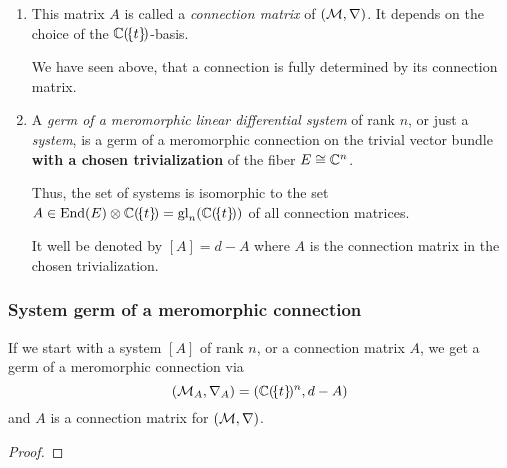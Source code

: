\begin{comment}
  This means that the connection $\nabla$ is fully determined by the matrix $A$
  and thus is fully determined by $A'$.
\end{comment}
\begin{defn}
  \begin{enumerate}
    \item This matrix $A$ is called a \emph{connection matrix} of
      $(\mathcal{M},\nabla)$. It depends on the choice of the $\mathbb{C}(\!\{t\}\!)$-basis.
      \begin{s-rem}
        We have seen above, that a connection is fully determined by its
        connection matrix.
      \end{s-rem}
    \item A \emph{germ of a meromorphic linear differential system} of rank
      $n$, or just a \emph{system}, is a germ of a meromorphic connection on
      the trivial vector bundle \textbf{with a chosen trivialization} of the
      fiber $E\cong\mathbb{C}^n$.
      \begin{s-prop}
        Thus, the set of systems is isomorphic to the set
        $A\in\operatorname{End}(E)\otimes\mathbb{C}(\!\{t\}\!)=\operatorname{gl}_n(\mathbb{C}(\!\{t\}\!))$ of all
        connection matrices.
      \end{s-prop}
      It well be denoted by $[A]=d-A$ where $A$ is the connection matrix in the
      chosen trivialization.
  \end{enumerate}
\end{defn}

\begin{comment}
  \cite{boalch} wants \textbf{generic} meromorphic connections
  \begin{itemize}
    \item\dots simplest jet sufficient\dots
  \end{itemize}
\end{comment}

\subsubsection{System \rightarrow{} germ of a meromorphic connection}
\begin{prop}
  If we start with a system $[A]$ of rank $n$, or a connection matrix $A$, we
  get a germ of a meromorphic connection via
  \[
    (\mathcal{M}_A,\nabla_A)=(\mathbb{C}(\!\{t\}\!)^n,d-A)
  \]
  and $A$ is a connection matrix for $(\mathcal{M},\nabla)$.
\end{prop}
\begin{proof}
  \TODO{}
\end{proof}

